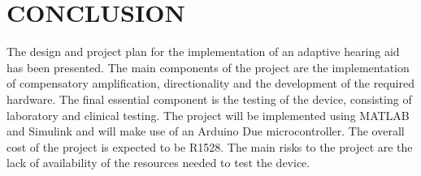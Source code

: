 \documentclass[10pt,twocolumn]{witseiepaper}
\begin{document}
\section{CONCLUSION}
The design and project plan for the implementation of an adaptive hearing aid has been presented. The main components of the project are the implementation of compensatory amplification, directionality and the development of the required hardware. The final essential component is the testing of the device, consisting of laboratory and clinical testing. The project will be implemented using MATLAB and Simulink and will make use of an Arduino Due microcontroller. The overall cost of the project is expected to be R1528. The main risks to the project are the lack of availability of the resources needed to test the device.



\end{document}
